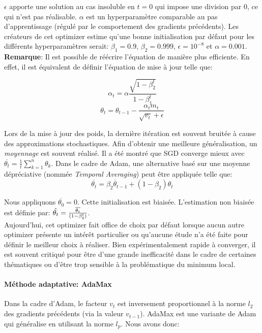 \noindent $\epsilon$ apporte une solution au cas insoluble en $t=0$ qui impose une division par 0, ce qui n'est pas réalisable. $\alpha$ est un hyperparamètre comparable au pas d'apprentissage (régulé par le comportement des gradients précédents). Les créateurs de cet optimizer estime qu'une bonne initialisation par défaut pour les différents hyperparamètres serait: $\beta_1=0.9$, $\beta_2=0.999$, $\epsilon=10^{-8}$ et $\alpha=0.001$.\\

\noindent \textbf{Remarque}: Il est possible de réécrire l'équation de manière plus efficiente. En effet, il est équivalent de définir l'équation de mise à jour telle que:

$$\alpha_t=\alpha \frac{\sqrt{1-\beta_2^t}}{1-\beta_1^t}$$
$$\theta_{t} = \theta_{t-1} - \dfrac{\alpha_t m_t}{\sqrt{v_t} + \epsilon}$$

\noindent Lors de la mise à jour des poids, la dernière itération est souvent bruitée à cause des approximations stochastiques. Afin d'obtenir une meilleure généralisation, un \textit{moyennage} est souvent réalisé. Il a été montré que SGD converge mieux avec $\overline{\theta_t}=\frac{1}{t}\sum_{k=1}^n\theta_k$. Dans le cadre de Adam, une alternative basé sur une moyenne dépréciative (nommée \textit{Temporal Averaging}) peut être appliquée telle que:
$$\overline{\theta_t}=\beta_2\overline{\theta}_{t-1}+(1-\beta_2)\theta_t$$

\noindent Nous appliquons $\overline{\theta_0}=0$. Cette initialisation est biaisée. L'estimation non biaisée est définie par: $\Hat{\theta_t}=\frac{\overline{\theta_t}}{(1-\beta_2^t)}$.\\


\noindent Aujourd'hui, cet optimizer fait office de choix par défaut lorsque aucun autre optimizer présente un intérêt particulier ou qu'aucune étude n'a été faite pour définir le meilleur choix à réaliser. Bien expérimentalement rapide à converger, il est souvent critiqué pour être d'une grande inefficacité dans le cadre de certaines thématiques ou d'être trop sensible à la problématique du minimum local.

\paragraph{Méthode adaptative: AdaMax}
Dans la cadre d'Adam, le facteur $v_t$ est inversement proportionnel à la norme $l_2$ des gradients précédents (via la valeur $v_{t-1}$). AdaMax\cite{adam_and_max} est une variante de Adam qui généralise en utilisant la norme $l_p$. Nous avons donc:

